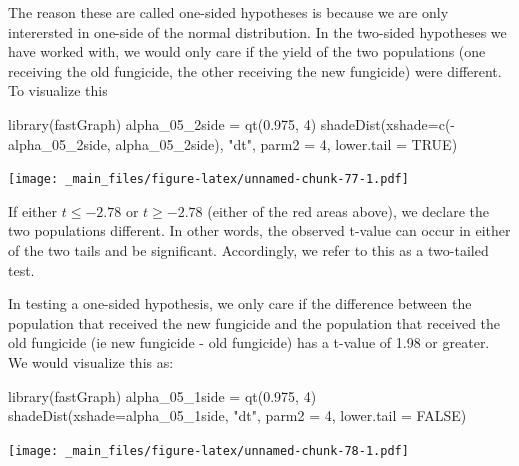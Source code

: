 \documentclass[
]{book}
\newenvironment{Shaded}{\begin{snugshade}}{\end{snugshade}}
\newcommand{\AttributeTok}[1]{\textcolor[rgb]{0.77,0.63,0.00}{#1}}
\newcommand{\ConstantTok}[1]{\textcolor[rgb]{0.00,0.00,0.00}{#1}}
\newcommand{\DecValTok}[1]{\textcolor[rgb]{0.00,0.00,0.81}{#1}}
\newcommand{\FloatTok}[1]{\textcolor[rgb]{0.00,0.00,0.81}{#1}}
\newcommand{\FunctionTok}[1]{\textcolor[rgb]{0.00,0.00,0.00}{#1}}
\newcommand{\NormalTok}[1]{#1}
\newcommand{\OtherTok}[1]{\textcolor[rgb]{0.56,0.35,0.01}{#1}}
\newcommand{\SpecialCharTok}[1]{\textcolor[rgb]{0.00,0.00,0.00}{#1}}
\newcommand{\StringTok}[1]{\textcolor[rgb]{0.31,0.60,0.02}{#1}}
\begin{document}
The reason these are called one-sided hypotheses is because we are only interersted in one-side of the normal distribution. In the two-sided hypotheses we have worked with, we would only care if the yield of the two populations (one receiving the old fungicide, the other receiving the new fungicide) were different. To visualize this

\begin{Shaded}
\begin{Highlighting}[]
\FunctionTok{library}\NormalTok{(fastGraph)}
\NormalTok{alpha\_05\_2side }\OtherTok{=} \FunctionTok{qt}\NormalTok{(}\FloatTok{0.975}\NormalTok{, }\DecValTok{4}\NormalTok{)}
\FunctionTok{shadeDist}\NormalTok{(}\AttributeTok{xshade=}\FunctionTok{c}\NormalTok{(}\SpecialCharTok{{-}}\NormalTok{alpha\_05\_2side, alpha\_05\_2side), }\StringTok{"dt"}\NormalTok{, }\AttributeTok{parm2 =} \DecValTok{4}\NormalTok{, }\AttributeTok{lower.tail =} \ConstantTok{TRUE}\NormalTok{)}
\end{Highlighting}
\end{Shaded}

\texttt{[image: \_main\_files/figure-latex/unnamed-chunk-77-1.pdf]}

If either \(t\le-2.78\) or \(t\ge-2.78\) (either of the red areas above), we declare the two populations different. In other words, the observed t-value can occur in either of the two tails and be significant. Accordingly, we refer to this as a two-tailed test.

In testing a one-sided hypothesis, we only care if the difference between the population that received the new fungicide and the population that received the old fungicide (ie new fungicide - old fungicide) has a t-value of 1.98 or greater. We would visualize this as:

\begin{Shaded}
\begin{Highlighting}[]
\FunctionTok{library}\NormalTok{(fastGraph)}
\NormalTok{alpha\_05\_1side }\OtherTok{=} \FunctionTok{qt}\NormalTok{(}\FloatTok{0.975}\NormalTok{, }\DecValTok{4}\NormalTok{)}
\FunctionTok{shadeDist}\NormalTok{(}\AttributeTok{xshade=}\NormalTok{alpha\_05\_1side, }\StringTok{"dt"}\NormalTok{, }\AttributeTok{parm2 =} \DecValTok{4}\NormalTok{, }\AttributeTok{lower.tail =} \ConstantTok{FALSE}\NormalTok{)}
\end{Highlighting}
\end{Shaded}

\texttt{[image: \_main\_files/figure-latex/unnamed-chunk-78-1.pdf]}
\end{document}
